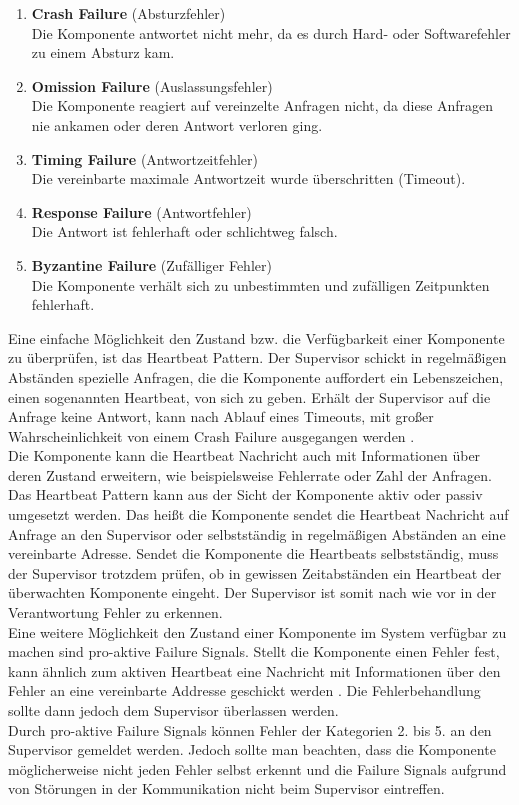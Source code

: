 \begin{enumerate}
\item \textbf{Crash Failure} (Absturzfehler)\\
Die Komponente antwortet nicht mehr, da es durch Hard- oder Softwarefehler zu einem Absturz kam.
\item \textbf{Omission Failure} (Auslassungsfehler)\\
Die Komponente reagiert auf vereinzelte Anfragen nicht, da diese Anfragen nie ankamen oder deren Antwort verloren ging.
\item \textbf{Timing Failure} (Antwortzeitfehler)\\
Die vereinbarte maximale Antwortzeit wurde überschritten (Timeout).
\item \textbf{Response Failure} (Antwortfehler)\\
Die Antwort ist fehlerhaft oder schlichtweg falsch.
\item \textbf{Byzantine Failure} (Zufälliger Fehler)\\
Die Komponente verhält sich zu unbestimmten und zufälligen Zeitpunkten fehlerhaft.
\end{enumerate}

Eine einfache Möglichkeit den Zustand bzw. die Verfügbarkeit einer Komponente zu überprüfen, ist das Heartbeat Pattern. Der Supervisor schickt in regelmäßigen Abständen spezielle Anfragen, die die Komponente auffordert ein Lebenszeichen, einen sogenannten Heartbeat, von sich zu geben. Erhält der Supervisor auf die Anfrage keine Antwort, kann nach Ablauf eines Timeouts, mit großer Wahrscheinlichkeit von einem Crash Failure ausgegangen werden \cite[S.~200~\&~S.~201]{kuhn_reactive_2015}.\\
Die Komponente kann die Heartbeat Nachricht auch mit Informationen über deren Zustand erweitern, wie beispielsweise Fehlerrate oder Zahl der Anfragen.\\
Das Heartbeat Pattern kann aus der Sicht der Komponente aktiv oder passiv umgesetzt werden. Das heißt die Komponente sendet die Heartbeat Nachricht auf Anfrage an den Supervisor oder selbstständig in regelmäßigen Abständen an eine vereinbarte Adresse. Sendet die Komponente die Heartbeats selbstständig, muss der Supervisor trotzdem prüfen, ob in gewissen Zeitabständen ein Heartbeat der überwachten Komponente eingeht. Der Supervisor ist somit nach wie vor in der Verantwortung Fehler zu erkennen.\\

Eine weitere Möglichkeit den Zustand einer Komponente im System verfügbar zu machen sind pro-aktive Failure Signals. Stellt die Komponente einen Fehler fest, kann ähnlich zum aktiven Heartbeat eine Nachricht mit Informationen über den Fehler an eine vereinbarte Addresse geschickt werden \cite[S.~201~\&~S.202]{kuhn_reactive_2015}. Die Fehlerbehandlung sollte dann jedoch dem Supervisor überlassen werden.\\
Durch pro-aktive Failure Signals können Fehler der Kategorien 2. bis 5. an den Supervisor gemeldet werden. Jedoch sollte man beachten, dass die Komponente möglicherweise nicht jeden Fehler selbst erkennt und die Failure Signals aufgrund von Störungen in der Kommunikation nicht beim Supervisor eintreffen.\\

